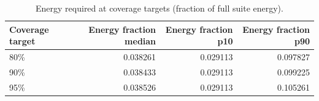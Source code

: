 \begin{table}[t]
\centering
\caption{Energy required at coverage targets (fraction of full suite energy).}
\label{tab:energy_frac_full}
\begin{tabular}{lrrr}
\toprule
Coverage target & Energy fraction median & Energy fraction p10 & Energy fraction p90 \\
\midrule
80\% & 0.038261 & 0.029113 & 0.097827 \\
90\% & 0.038433 & 0.029113 & 0.099225 \\
95\% & 0.038526 & 0.029113 & 0.105261 \\
\bottomrule
\end{tabular}

\end{table}